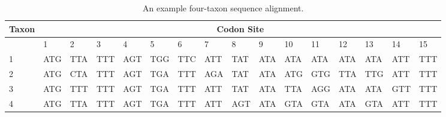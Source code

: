 \setlength\tabcolsep{0 pt}
\begin{table}[h]
  \begin{tabular}{|l|lllllllllllllll|}
    \multicolumn{1}{c}{Taxon} & \multicolumn{15}{c}{Codon Site} \\
    \hline
                        & 1   & 2                        & 3   & 4                        & 5   & 6                        & 7   & 8                        & 9   & 10                       & 11  & 12                       & 13  & 14                       & 15  \\
    1 \hspace{1em}      & ATG & \cellcolor{lightgray}TTA & TTT & \cellcolor{lightgray}AGT & TGG & \cellcolor{lightgray}TTC & ATT & \cellcolor{lightgray}TAT & ATA & \cellcolor{lightgray}ATA & ATA & \cellcolor{lightgray}ATA & ATA & \cellcolor{lightgray}ATT & TTT \\
    2                   & ATG & \cellcolor{lightgray}CTA & TTT & \cellcolor{lightgray}AGT & TGA & \cellcolor{lightgray}TTT & AGA & \cellcolor{lightgray}TAT & ATA & \cellcolor{lightgray}ATG & GTG & \cellcolor{lightgray}TTA & TTG & \cellcolor{lightgray}ATT & TTT \\
    3                   & ATG & \cellcolor{lightgray}TTT & TTT & \cellcolor{lightgray}AGT & TGA & \cellcolor{lightgray}TTT & ATT & \cellcolor{lightgray}TAT & ATA & \cellcolor{lightgray}TTA & AGG & \cellcolor{lightgray}ATA & ATA & \cellcolor{lightgray}GTT & TTT \\
    4                   & ATG & \cellcolor{lightgray}TTA & TTT & \cellcolor{lightgray}AGT & TGA & \cellcolor{lightgray}TTT & ATT & \cellcolor{lightgray}AGT & ATA & \cellcolor{lightgray}GTA & GTA & \cellcolor{lightgray}ATA & GTA & \cellcolor{lightgray}ATT & TTT \\
    \hline
  \end{tabular}
  \caption{An example four-taxon sequence alignment.}
  \label{tab:sampalign}
\end{table}
\setlength\tabcolsep{6 pt}